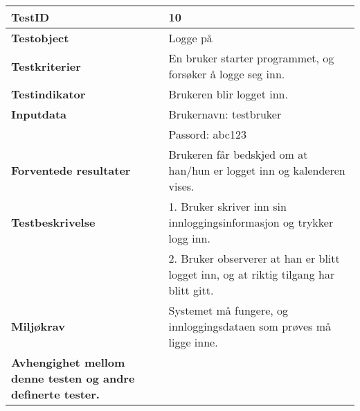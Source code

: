 	\begin{tabularx}{1.2\textwidth}{| p{5cm} | X |}
	\hline
	\textbf{TestID} 																& 10																	\\ \hline
	\textbf{Testobject} 															& Logge på															\\ \hline
	\textbf{Testkriterier} 															& En bruker starter programmet, og forsøker å logge seg inn.							\\ \hline
	\textbf{Testindikator} 															& Brukeren blir logget inn.													\\ \hline
	\textbf{Inputdata} 															& Brukernavn: testbruker													\\ 
																			& Passord: abc123														\\  \hline
	\textbf{Forventede resultater}									 				& Brukeren får bedskjed om at han/hun er logget inn og kalenderen vises.				\\ \hline
	\textbf{Testbeskrivelse} 														& 1. Bruker skriver inn sin innloggingsinformasjon og trykker logg inn.					\\
																			& 2. Bruker observerer at han er blitt logget inn, og at riktig tilgang har blitt gitt.					\\ \hline
	\textbf{Miljøkrav}			 												& Systemet må fungere, og innloggingsdataen som prøves må ligge inne.						\\ \hline
	\textbf{Avhengighet mellom denne testen og andre definerte tester.}		 				&				 													\\ \hline
	\end{tabularx}

\mbox{}\\

